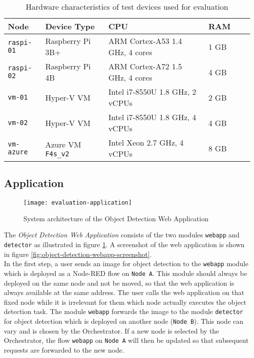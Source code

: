 \begin{table}[htb]
    \centering
    \begin{tabular}{|l|l|l|l|l|l|}
    \hline
        \textbf{Node} & \textbf{Device Type} & \textbf{CPU} & \textbf{RAM} \\
         \hline
         \texttt{raspi-01} & Raspberry Pi 3B+ & ARM Cortex-A53 1.4 GHz, 4 cores & 1 GB\\
         \hline
         \texttt{raspi-02} & Raspberry Pi 4B & ARM Cortex-A72 1.5 GHz, 4 cores & 4 GB\\
         \hline
         \texttt{vm-01} & Hyper-V VM & Intel i7-8550U 1.8 GHz, 2 vCPUs & 2 GB\\
         \hline
         \texttt{vm-02} & Hyper-V VM & Intel i7-8550U 1.8 GHz, 4 vCPUs & 4 GB\\
         \hline
         \texttt{vm-azure} & Azure VM \texttt{F4s\_v2} & Intel Xeon 2.7 GHz, 4 vCPUs & 8 GB\\
         \hline
    \end{tabular}
    \caption{Hardware characteristics of test devices used for evaluation}
    \label{tab:evaluation-devices}
\end{table}

\subsection{Application\label{sec:eval-application}}

\begin{figure}[htb]
    \centering
    \texttt{[image: evaluation-application]}
    \caption{System architecture of the Object Detection Web Application}
    \label{fig:evaluation-object-detection-application}
\end{figure}

The \textit{Object Detection Web Application} consists of the two modules \texttt{webapp} and \mbox{\texttt{detector}} as illustrated in figure \ref{fig:evaluation-object-detection-application}.
A screenshot of the web application is shown in figure \ref{fig:object-detection-webapp-screenshot}.\\

In the first step, a user sends an image for object detection to the \texttt{webapp} module which is deployed as a Node-RED flow on \texttt{Node A}.
This module should always be deployed on the same node and not be moved, so that the web application is always available at the same address.
The user calls the web application on that fixed node while it is irrelevant for them which node actually executes the object detection task.
The module \texttt{webapp} forwards the image to the module \texttt{detector} for object detection which is deployed on another node (\texttt{Node B}).
This node can vary and is chosen by the Orchestrator.
If a new node is selected by the Orchestrator, the flow \texttt{webapp} on \texttt{Node A} will then be updated so that subsequent requests are forwarded to the new node.\\

